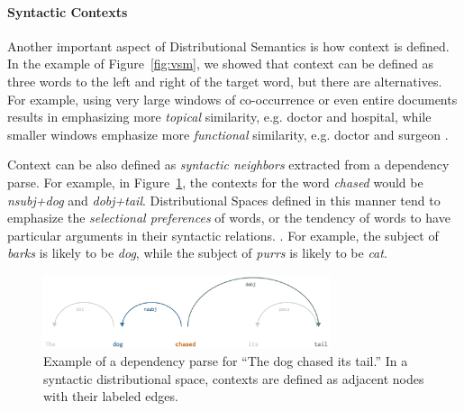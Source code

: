 \documentclass[12pt]{article}
\begin{document}
\paragraph{Syntactic Contexts}
Another important aspect of Distributional Semantics is how context is defined.
In the example of Figure~\ref{fig:vsm}, we showed that context can be defined
as three words to the left and right of the target word, but there are
alternatives. For example, using very large windows of co-occurrence or even
entire documents results in emphasizing more {\em topical} similarity, e.g. doctor
and hospital, while smaller windows emphasize more {\em functional} similarity, e.g.
doctor and surgeon \cite{pado:2007:cl,erk:2008:emnlp,levy:2014:acl}.

Context can be also defined as {\em syntactic neighbors} extracted from a
dependency parse. For example, in Figure~\ref{fig:syn}, the
contexts for the word {\em chased} would be {\em nsubj+dog} and {\em
dobj+tail}. Distributional Spaces defined in this manner tend to emphasize the
{\em selectional preferences} of words, or the tendency of words to have
particular arguments in their syntactic relations.
\cite{pado:2007:cl,erk:2008:emnlp,baroni:2010:cl,levy:2014:acl}. For example,
the subject of {\em barks} is likely to be {\em dog}, while the subject of
{\em purrs} is likely to be {\em cat}.

\begin{figure}
  \centering
  \includegraphics[width=0.75\textwidth]{figures/syn}
\caption{Example of a dependency parse for ``The dog chased its tail.'' In
a syntactic distributional space, contexts are defined as adjacent nodes
with their labeled edges.}
\label{fig:syn}
\end{figure}
\end{document}

